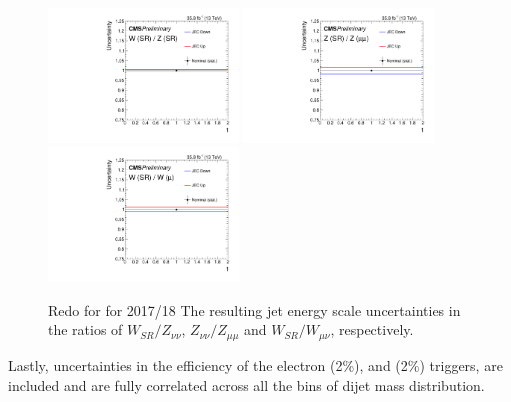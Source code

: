 \begin{figure}[!htb]
\begin{center}
  \includegraphics[width=0.45\textwidth]{fig/unc/jec_ratio_WJets_signal_signal_1.pdf}
  \includegraphics[width=0.45\textwidth]{fig/unc/jec_ratio_ZtoNuNu_signal_dimuon_1.pdf}
  \includegraphics[width=0.45\textwidth]{fig/unc/jec_ratio_WJets_signal_singlemuon_1.pdf}
\caption{{\color{red} Redo for for 2017/18} The resulting jet energy scale uncertainties in the ratios of $W_{SR}/Z_{\nu\nu}$, $Z_{\nu\nu}/Z_{\mu\mu}$ and $W_{SR}/W_{\mu\nu}$, respectively.}
\label{fig:unc_jec}
\end{center}\end{figure}

Lastly, uncertainties in the efficiency of the electron (2\%), and \ptmiss (2\%) triggers, are included and are fully correlated
across all the bins of dijet mass distribution.

